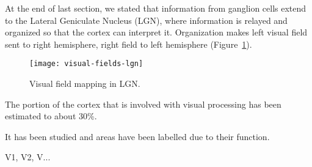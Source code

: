 At the end of last section, we stated that information from ganglion cells extend to the Lateral Geniculate Nucleus (LGN), where information is relayed and organized so that the cortex can interpret it. Organization makes left visual field sent to right hemisphere, right field to left hemisphere (Figure~\ref{fig:vision:optic-chiasm}).

\begin{figure}
  \begin{center}
    \texttt{[image: visual-fields-lgn]}
    \caption{Visual field mapping in LGN.}
    \label{fig:vision:optic-chiasm}
  \end{center}
\end{figure}

The portion of the cortex that is involved with visual processing has been estimated to about 30\%.

It has been studied and areas have been labelled due to their function.

V1, V2, V...

